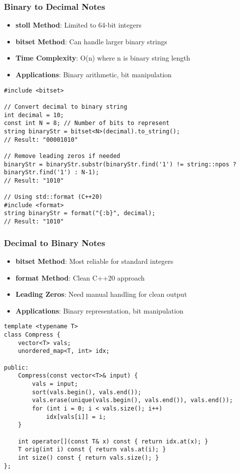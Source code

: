 \documentclass[11pt,a4paper]{article}
\begin{document}
\subsubsection{Binary to Decimal Notes}
\begin{itemize}
\item \textbf{stoll Method}: Limited to 64-bit integers
\item \textbf{bitset Method}: Can handle larger binary strings
\item \textbf{Time Complexity}: O(n) where n is binary string length
\item \textbf{Applications}: Binary arithmetic, bit manipulation
\end{itemize}

\newpage
\begin{lstlisting}[caption={Decimal to Binary Conversion}]
#include <bitset>

// Convert decimal to binary string
int decimal = 10;
const int N = 8; // Number of bits to represent
string binaryStr = bitset<N>(decimal).to_string();
// Result: "00001010"

// Remove leading zeros if needed
binaryStr = binaryStr.substr(binaryStr.find('1') != string::npos ? binaryStr.find('1') : N-1);
// Result: "1010"

// Using std::format (C++20)
#include <format>
string binaryStr = format("{:b}", decimal);
// Result: "1010"
\end{lstlisting}

\subsubsection{Decimal to Binary Notes}
\begin{itemize}
\item \textbf{bitset Method}: Most reliable for standard integers
\item \textbf{format Method}: Clean C++20 approach
\item \textbf{Leading Zeros}: Need manual handling for clean output
\item \textbf{Applications}: Binary representation, bit manipulation
\end{itemize}

\newpage
\begin{lstlisting}[caption={Coordinate Compression Template}]
template <typename T>
class Compress {
    vector<T> vals;
    unordered_map<T, int> idx;

public:
    Compress(const vector<T>& input) {
        vals = input;
        sort(vals.begin(), vals.end());
        vals.erase(unique(vals.begin(), vals.end()), vals.end());
        for (int i = 0; i < vals.size(); i++)
            idx[vals[i]] = i;
    }

    int operator[](const T& x) const { return idx.at(x); }
    T orig(int i) const { return vals.at(i); }
    int size() const { return vals.size(); }
};
\end{lstlisting}
\end{document}
